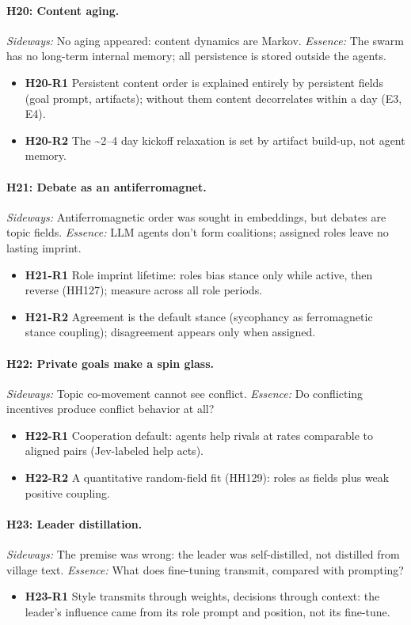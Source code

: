 \documentclass[aps,pre,reprint,10pt,nofootinbib]{revtex4-2}
\begin{document}
\paragraph{H20: Content aging.} \emph{Sideways:} No aging appeared: content dynamics are Markov. \emph{Essence:} The swarm has no long-term internal memory; all persistence is stored outside the agents.
\begin{itemize}\setlength{\itemsep}{0pt}
\item \textbf{H20-R1} Persistent content order is explained entirely by persistent fields (goal prompt, artifacts); without them content decorrelates within a day (E3, E4).
\item \textbf{H20-R2} The \textasciitilde{}2–4 day kickoff relaxation is set by artifact build-up, not agent memory.
\end{itemize}
\paragraph{H21: Debate as an antiferromagnet.} \emph{Sideways:} Antiferromagnetic order was sought in embeddings, but debates are topic fields. \emph{Essence:} LLM agents don't form coalitions; assigned roles leave no lasting imprint.
\begin{itemize}\setlength{\itemsep}{0pt}
\item \textbf{H21-R1} Role imprint lifetime: roles bias stance only while active, then reverse (HH127); measure across all role periods.
\item \textbf{H21-R2} Agreement is the default stance (sycophancy as ferromagnetic stance coupling); disagreement appears only when assigned.
\end{itemize}
\paragraph{H22: Private goals make a spin glass.} \emph{Sideways:} Topic co-movement cannot see conflict. \emph{Essence:} Do conflicting incentives produce conflict behavior at all?
\begin{itemize}\setlength{\itemsep}{0pt}
\item \textbf{H22-R1} Cooperation default: agents help rivals at rates comparable to aligned pairs (Jev-labeled help acts).
\item \textbf{H22-R2} A quantitative random-field fit (HH129): roles as fields plus weak positive coupling.
\end{itemize}
\paragraph{H23: Leader distillation.} \emph{Sideways:} The premise was wrong: the leader was self-distilled, not distilled from village text. \emph{Essence:} What does fine-tuning transmit, compared with prompting?
\begin{itemize}\setlength{\itemsep}{0pt}
\item \textbf{H23-R1} Style transmits through weights, decisions through context: the leader's influence came from its role prompt and position, not its fine-tune.
\end{itemize}
\end{document}
